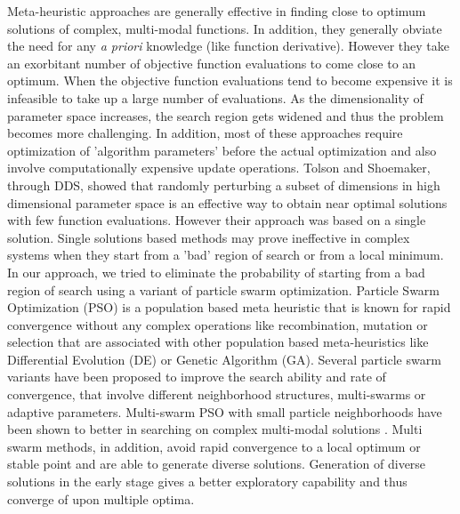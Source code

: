 \documentclass[12pt]{article}
\begin{document}
Meta-heuristic approaches are generally effective in finding close to optimum solutions of complex, multi-modal functions. In addition, they generally obviate the need for any \textit{a priori} knowledge (like function derivative). However they take an exorbitant number of objective function evaluations to come close to an optimum. When the objective function evaluations tend to become expensive it is infeasible to take up a large number of evaluations. As the dimensionality of parameter space increases, the search region gets widened and thus the problem becomes more challenging.  In addition, most of these approaches require optimization of  'algorithm parameters' before the actual optimization and also involve computationally expensive update operations.  Tolson and Shoemaker, through DDS, showed that randomly perturbing a subset of dimensions in high dimensional parameter space is an effective way to obtain near optimal solutions with few function evaluations. However their approach was based on a single solution. Single solutions based methods may prove ineffective in complex systems when they start from a 'bad' region of search or from a local minimum. In our approach, we tried to eliminate the probability of starting from a bad region of search using a variant of particle swarm optimization. Particle Swarm Optimization (PSO) is a population based meta heuristic that is known for rapid convergence without any complex operations like recombination, mutation or selection that are associated with other population based meta-heuristics like Differential Evolution (DE) or Genetic Algorithm (GA). Several particle swarm variants have been proposed to improve the search ability and rate of convergence, that involve different neighborhood structures, multi-swarms or adaptive parameters. Multi-swarm PSO with small particle neighborhoods have been shown to better in searching on complex multi-modal solutions \cite{zhao2008dynamic}. Multi swarm methods, in addition, avoid rapid convergence to a local optimum or stable point and are able to generate diverse solutions.  Generation of diverse solutions in the early stage gives a better exploratory capability and thus converge of upon multiple optima.
\end{document}
